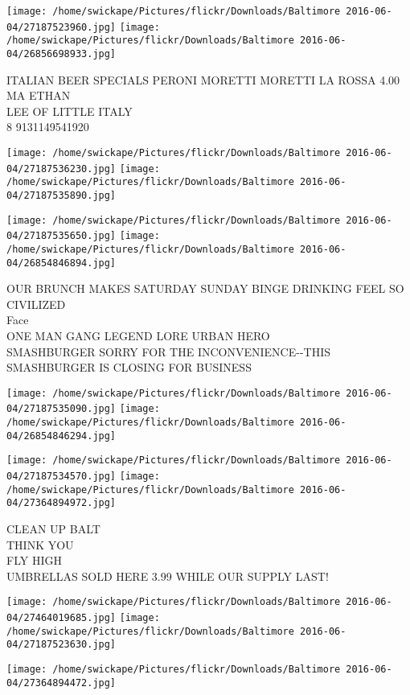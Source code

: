 \documentclass[10pt,letterpaper]{article}
\begin{document}
\texttt{[image: /home/swickape/Pictures/flickr/Downloads/Baltimore 2016-06-04/27187523960.jpg]}
\texttt{[image: /home/swickape/Pictures/flickr/Downloads/Baltimore 2016-06-04/26856698933.jpg]}

ITALIAN BEER SPECIALS PERONI MORETTI MORETTI LA ROSSA 4.00\\
MA ETHAN\\
LEE OF LITTLE ITALY\\
8 9131149541920
\pagebreak

\texttt{[image: /home/swickape/Pictures/flickr/Downloads/Baltimore 2016-06-04/27187536230.jpg]}
\texttt{[image: /home/swickape/Pictures/flickr/Downloads/Baltimore 2016-06-04/27187535890.jpg]}

\texttt{[image: /home/swickape/Pictures/flickr/Downloads/Baltimore 2016-06-04/27187535650.jpg]}
\texttt{[image: /home/swickape/Pictures/flickr/Downloads/Baltimore 2016-06-04/26854846894.jpg]}

OUR BRUNCH MAKES SATURDAY SUNDAY BINGE DRINKING FEEL SO CIVILIZED\\
Face\\
ONE MAN GANG LEGEND LORE URBAN HERO\\
SMASHBURGER SORRY FOR THE INCONVENIENCE{-}{-}THIS SMASHBURGER IS CLOSING FOR BUSINESS
\pagebreak

\texttt{[image: /home/swickape/Pictures/flickr/Downloads/Baltimore 2016-06-04/27187535090.jpg]}
\texttt{[image: /home/swickape/Pictures/flickr/Downloads/Baltimore 2016-06-04/26854846294.jpg]}

\texttt{[image: /home/swickape/Pictures/flickr/Downloads/Baltimore 2016-06-04/27187534570.jpg]}
\texttt{[image: /home/swickape/Pictures/flickr/Downloads/Baltimore 2016-06-04/27364894972.jpg]}

CLEAN UP BALT\\
THINK YOU\\
FLY HIGH\\
UMBRELLAS SOLD HERE 3.99 WHILE OUR SUPPLY LAST!
\pagebreak

\texttt{[image: /home/swickape/Pictures/flickr/Downloads/Baltimore 2016-06-04/27464019685.jpg]}
\texttt{[image: /home/swickape/Pictures/flickr/Downloads/Baltimore 2016-06-04/27187523630.jpg]}

\texttt{[image: /home/swickape/Pictures/flickr/Downloads/Baltimore 2016-06-04/27364894472.jpg]}
\end{document}
